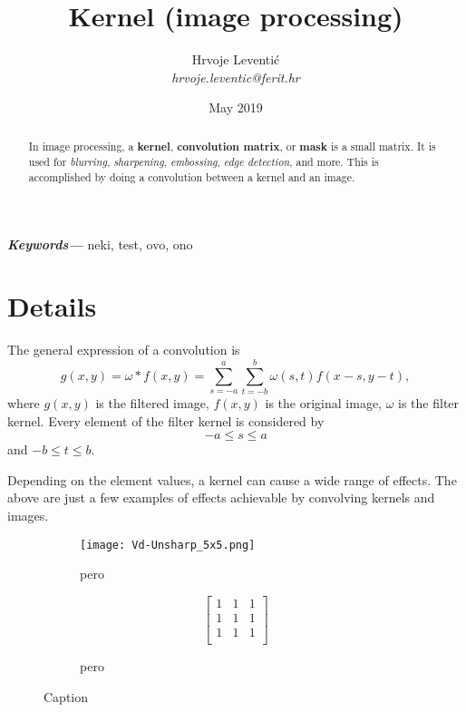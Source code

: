 \documentclass{article}
\title{Kernel (image processing)}
\author{Hrvoje Leventić\\
\emph{hrvoje.leventic@ferit.hr} }
\date{May 2019}
\begin{document}
\maketitle

\begin{abstract}
    In image processing, a \textbf{kernel}, \textbf{convolution matrix}, or \textbf{mask} is a small matrix. It is used for \textit{blurring}, \textit{sharpening}, \textit{embossing}, \textit{edge detection}, and more. This is accomplished by doing a convolution between a kernel and an image. 
\end{abstract}

\providecommand{\keywords}[1]
{
  \small	
  \textbf{\textit{Keywords---}} #1
}
\keywords{neki, test, ovo, ono}

\tableofcontents


\section{Details}

The general expression of a convolution is 
\begin{equation}
    g(x,y) = \omega * f(x,y) = \sum_{s=-a}^a \sum_{t=-b}^b \omega(s,t)f(x-s,y-t),
\end{equation}
where $g(x,y)$ is the filtered image, $f(x,y)$ is the original image, $\omega$ is the filter kernel. Every element of the filter kernel is considered by $$-a \leq s \leq a$$ and $-b \leq t \leq b$.

Depending on the element values, a kernel can cause a wide range of effects. The above are just a few examples of effects achievable by convolving kernels and images. 

\begin{figure}
    \centering
    \begin{subfigure}[t]{.45\textwidth}
        \centering\texttt{[image: Vd-Unsharp\_5x5.png]}
        \caption{pero}\label{fig:pero}
    \end{subfigure}
    \begin{subfigure}[t]{.45\textwidth}
        \centering\vbox{%
        $$
            \begin{bmatrix}
             1 & 1 & 1 \\
             1 & 1 & 1 \\
             1 & 1 & 1 \\
            \end{bmatrix}
        $$
        }
        
        \caption{pero}\label{fig:pero}
    \end{subfigure}
    \caption{Caption}
    \label{fig:my_label}
\end{figure}
\end{document}
